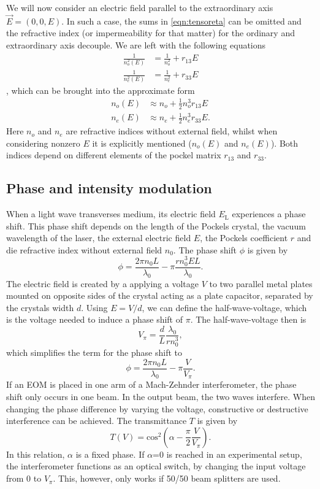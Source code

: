We will now consider an electric field parallel to the extraordinary axis $\vec{E} = (0, 0, E)$. In such a case, the sums in \autoref{eqn:tensoreta} can be omitted and the refractive index (or impermeability for that matter) for the ordinary and extraordinary axis decouple. We are left with the following equations
\begin{align*}
	\frac{1}{n_o^2(E)} &= \frac{1}{n_o^2} + r_{13}E \\
	\frac{1}{n_e^2(E)} &= \frac{1}{n_e^2} + r_{33}E 
\end{align*}
, which can be brought into the approximate form
\begin{align}
	n_o(E) &\approx n_o + \frac{1}{2}n_o^3r_{13}E \\
	n_e(E) &\approx n_e + \frac{1}{2}n_e^3r_{33}E.
\end{align}
Here $n_o$ and $n_e$ are refractive indices without external field, whilst when considering nonzero $E$ it is explicitly mentioned ($n_o(E)$ and $n_e(E)$). Both indices depend on different elements of the pockel matrix $r_{13}$ and $r_{33}$.

\subsection{Phase and intensity modulation}
When a light wave transverses medium, its electric field $E_\mathrm{L}$ experiences a phase shift. This phase shift depends on the length of the Pockels crystal, the vacuum wavelength of the laser, the external electric field $E$, the Pockels coefficient $r$ and die refractive index without external field $n_0$. The phase shift $\phi$ is given by
\begin{equation*}
	\phi=\frac{2\pi n_0L}{\lambda_0}-\pi\frac{rn_0^3EL}{\lambda_0}. 
\end{equation*}
The electric field is created by a applying a voltage $V$ to two parallel metal plates mounted on opposite sides of the crystal acting as a plate capacitor, separated by the crystals width $d$. Using $E=V/d$, we can define the half-wave-voltage, which is the voltage needed to induce a phase shift of $\pi$. The half-wave-voltage then is 
\begin{equation}
	V_{\pi}=\frac{d}{L}\frac{\lambda_0}{r n_0^3},  \label{volt_pi_relation}
\end{equation}
which simplifies the term for the phase shift to 
\begin{equation}
	\phi=\frac{2\pi n_0L}{\lambda_0}-\pi\frac{V}{V_{\pi}}. 
\end{equation}
If an EOM is placed in one arm of a Mach-Zehnder interferometer, the phase shift only occurs in one beam. In the output beam, the two waves interfere. When changing the phase difference by varying the voltage, constructive or destructive interference can be achieved. The transmittance $T$ is given by 
\begin{equation}
	T(V)=\mathrm{cos}^2\left(\alpha-\frac{\pi}{2}\frac{V}{V_\pi}\right). \label{transmittance}
\end{equation}
In this relation, $\alpha$ is a fixed phase. If $\alpha$=0 is reached in an experimental setup, the interferometer functions as an optical switch, by changing the input voltage from 0 to $V_\pi$. This, however, only works if 50/50 beam splitters are used. 
